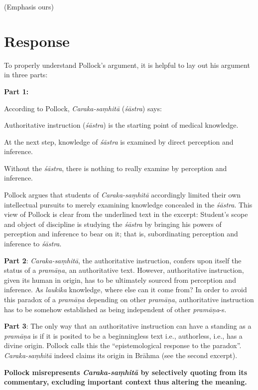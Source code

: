 (Emphasis ours)

\section*{Response}

To properly understand Pollock's argument, it is helpful to lay out his argument in three parts:

{\bf Part 1:}

According to Pollock, {\sl Caraka-saṃhitā} ({\sl śāstra}) says:
\begin{myquote}
Authoritative instruction ({\sl śāstra}) is the starting point of medical knowledge. 

At the next step, knowledge of {\sl śāstra} is examined by direct perception and inference.

Without the {\sl śāstra}, there is nothing to really examine by perception and inference.  
\end{myquote}

Pollock argues that students of {\sl Caraka-saṃhitā} accordingly limited their own intellectual pursuits to merely examining knowledge concealed in the {\sl śāstra}.  This view of Pollock is clear from the underlined text in the excerpt: Student's scope and object of discipline is studying the {\sl śāstra} by bringing his powers of perception and inference to bear on it; that is, subordinating perception and inference to {\sl śāstra}.

{\bf Part 2}: {\sl Caraka-saṃhitā}, the authoritative instruction, confers upon itself the status of a {\sl pramāṇa}, an authoritative text.  However, authoritative instruction, given its human in origin, has to be ultimately sourced from perception and inference.  As {\sl laukika} knowledge, where else can it come from? In order to avoid this paradox of a {\sl pramāṇa} depending on other {\sl pramāṇa}, authoritative instruction has to be somehow established as being independent of other {\sl pramāṇa}-s.

{\bf Part 3}: The only way that an authoritative instruction can have a standing as a {\sl pramāṇa} is if it is posited to be a beginningless text i.e., authorless, i.e., has a divine origin.  Pollock calls this the ``epistemological response to the paradox''. {\sl Caraka-saṃhitā} indeed claims its origin in Brāhma (see the second excerpt).

{\bf Pollock misrepresents {{\sl\bfseries Caraka-saṃhitā}\relax} by selectively quoting from its commentary, excluding important context thus altering the meaning.}

